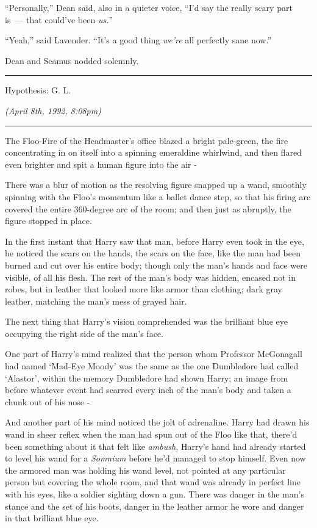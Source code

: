 ``Personally,'' Dean said, also in a quieter voice, ``I'd say the really scary part is~--- that could've been \emph{us.}''

``Yeah,'' said Lavender. ``It's a good thing \emph{we're} all perfectly sane now.''

Dean and Seamus nodded solemnly.

\begin{center}\rule{3in}{0.4pt}\end{center}

Hypothesis: G. L.

\emph{(April 8th, 1992, 8:08pm)}

\begin{center}\rule{3in}{0.4pt}\end{center}

The Floo-Fire of the Headmaster's office blazed a bright pale-green, the fire concentrating in on itself into a spinning emeraldine whirlwind, and then flared even brighter and spit a human figure into the air -

There was a blur of motion as the resolving figure snapped up a wand, smoothly spinning with the Floo's momentum like a ballet dance step, so that his firing arc covered the entire 360-degree arc of the room; and then just as abruptly, the figure stopped in place.

In the first instant that Harry saw that man, before Harry even took in the eye, he noticed the scars on the hands, the scars on the face, like the man had been burned and cut over his entire body; though only the man's hands and face were visible, of all his flesh. The rest of the man's body was hidden, encased not in robes, but in leather that looked more like armor than clothing; dark gray leather, matching the man's mess of grayed hair.

The next thing that Harry's vision comprehended was the brilliant blue eye occupying the right side of the man's face.

One part of Harry's mind realized that the person whom Professor McGonagall had named `Mad-Eye Moody' was the same as the one Dumbledore had called `Alastor', within the memory Dumbledore had shown Harry; an image from before whatever event had scarred every inch of the man's body and taken a chunk out of his nose -

And another part of his mind noticed the jolt of adrenaline. Harry had drawn his wand in sheer reflex when the man had spun out of the Floo like that, there'd been something about it that felt like \emph{ambush,} Harry's hand had already started to level his wand for a \emph{Somnium} before he'd managed to stop himself. Even now the armored man was holding his wand level, not pointed at any particular person but covering the whole room, and that wand was already in perfect line with his eyes, like a soldier sighting down a gun. There was danger in the man's stance and the set of his boots, danger in the leather armor he wore and danger in that brilliant blue eye.

